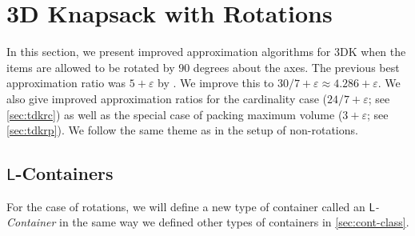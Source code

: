 \documentclass[10pt,a4paper]{amsart}
\newcommand{\eps}{\varepsilon}
\renewcommand{\epsilon}{\varepsilon} %
\newtheorem{theorem}{Theorem}[section]
\theoremstyle{definition}
\newcommand{\opt}{\mathtt{opt}}
\newcommand{\LContainer}{$\mathsf{L}$-Container}
\newcommand{\LContainers}{$\mathsf{L}$-Containers}
\newcommand{\OPT}{\mathrm{OPT}}
\begin{document}


\section{3D Knapsack with Rotations}
\label{sec:tdkr}
In this section, we present improved approximation algorithms for 3DK when the items are allowed to be rotated by $90$ degrees about the axes.
The previous best approximation ratio was $5+\eps$ by \cite{3d-knapsack}. We improve this to $30/7+\eps\approx4.286+\eps$.
We also give improved approximation ratios for the cardinality case ($24/7+\eps$; see \cref{sec:tdkrc}) as well as the special case of packing maximum volume ($3+\eps$; see \cref{sec:tdkrp}).
We follow the same theme as in the setup of non-rotations.
\subsection{\texorpdfstring{\LContainers}{L-Containers}}
\label{sec:Lcontainer}
For the case of rotations, we will define a new type of container called an \emph{\LContainer} in the same way we defined other types of containers in \cref{sec:cont-class}. 
\end{document}
